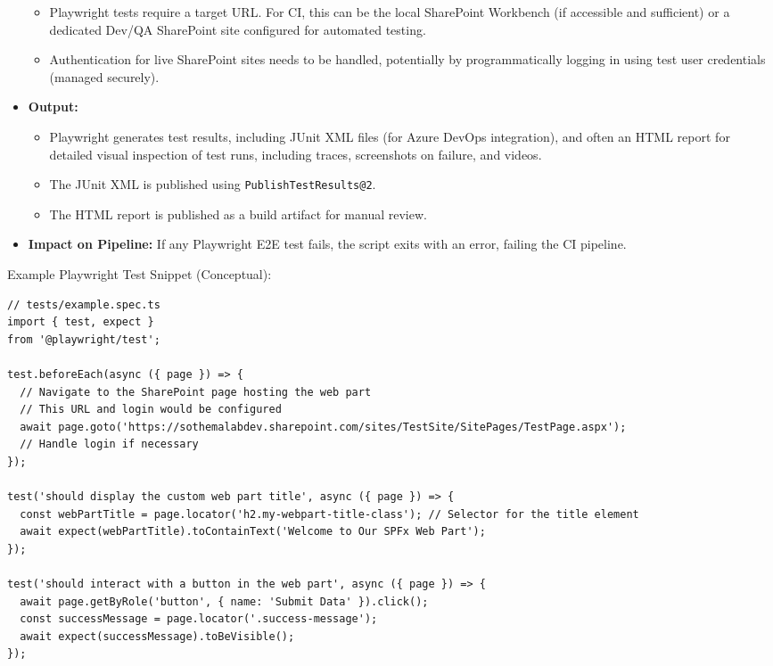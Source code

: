 \begin{itemize}
    \begin{itemize}
        \item Playwright tests require a target URL. For CI, this can be the local SharePoint Workbench (if accessible and sufficient) or a dedicated Dev/QA SharePoint site configured for automated testing.
        \item Authentication for live SharePoint sites needs to be handled, potentially by programmatically logging in using test user credentials (managed securely).
    \end{itemize}
    \item \textbf{Output:}
    \begin{itemize}
        \item Playwright generates test results, including JUnit XML files (for Azure DevOps integration), and often an HTML report for detailed visual inspection of test runs, including traces, screenshots on failure, and videos.
        \item The JUnit XML is published using \texttt{PublishTestResults@2}.
        \item The HTML report is published as a build artifact for manual review.
    \end{itemize}
    \item \textbf{Impact on Pipeline:} If any Playwright E2E test fails, the script exits with an error, failing the CI pipeline.
\end{itemize}

Example Playwright Test Snippet (Conceptual):
\begin{verbatim}
// tests/example.spec.ts
import { test, expect }
from '@playwright/test';

test.beforeEach(async ({ page }) => {
  // Navigate to the SharePoint page hosting the web part
  // This URL and login would be configured
  await page.goto('https://sothemalabdev.sharepoint.com/sites/TestSite/SitePages/TestPage.aspx');
  // Handle login if necessary
});

test('should display the custom web part title', async ({ page }) => {
  const webPartTitle = page.locator('h2.my-webpart-title-class'); // Selector for the title element
  await expect(webPartTitle).toContainText('Welcome to Our SPFx Web Part');
});

test('should interact with a button in the web part', async ({ page }) => {
  await page.getByRole('button', { name: 'Submit Data' }).click();
  const successMessage = page.locator('.success-message');
  await expect(successMessage).toBeVisible();
});
\end{verbatim}


